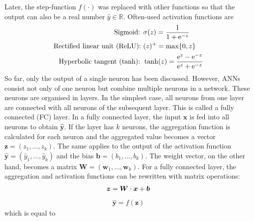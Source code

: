%
Later, the step-function \(f(\cdot)\) was replaced with other functions so that the output can also be a real number \(\hat{y} \in \mathbb{R}\). Often-used activation functions are
%
\begin{align}\eqlbl{act_functions}%
	\begin{aligned}
		\text{Sigmoid: } & \sigma(z) = \frac{1}{1+\mathrm{e}^{-z}}\\
		\text{Rectified linear unit (ReLU): } & (z)^{+} = \max\{0, z\}\\
		\text{Hyperbolic tangent (tanh): }  & \tanh(z) = \frac{\mathrm{e}^{z}-\mathrm{e}^{-z}}{\mathrm{e}^{z}+\mathrm{e}^{-z}}
	\end{aligned}
\end{align}
%
So far, only the output of a single neuron has been discussed.
However, ANNs consist not only of one neuron but combine multiple neurons in a network. 
These neurons are organised in layers.
In the simplest case, all neurons from one layer are connected with all neurons of the subsequent layer. This is called a fully connected (FC) layer.
In a fully connected layer, the input $\boldsymbol{x}$ is fed into all neurons to obtain $\boldsymbol{\hat{y}}$.
If the layer has $k$ neurons, the aggregation function is calculated for each neuron and the aggregated value becomes a vector $\boldsymbol{z} = (z_1, ..., z_k)$. The same applies to the output of the activation function $\boldsymbol{\hat{y}} = (\hat{y}_1, ..., \hat{y}_k)$ and the bias $\boldsymbol{b} = (b_1, ..., b_k)$. The weight vector, on the other hand, becomes a matrix $\boldsymbol{W} = (\boldsymbol{w}_1, ..., \boldsymbol{w}_k)$. For a fully connected layer, the aggregation and activation functions can be rewritten with matrix operations:
%
\begin{align}\eqlbl{nn3}%
	\boldsymbol{z} = \boldsymbol{W} \cdot \boldsymbol{x} + \boldsymbol{b}
\end{align}
\begin{align}
	\hat{\boldsymbol{y}} = f(\boldsymbol{z})
\end{align}
%
which is equal to
%
